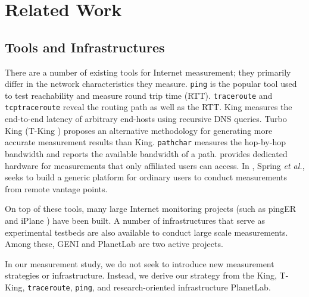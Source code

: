 \section{Related Work}
\label{sec:related-work}


\subsection{Tools and Infrastructures}
\label{sec:tools}

There are a number of existing tools for Internet measurement; they primarily differ in the network characteristics they measure. \texttt{ping} is the popular tool used to test reachability and measure round trip time (RTT). \texttt{traceroute} \cite{jacobson1989traceroute} and \texttt{tcptraceroute} \cite{toren2001tcptraceroute} reveal the routing path as well as the RTT. King \cite{gummadi2002king} measures the end-to-end latency of arbitrary end-hosts using recursive DNS queries. Turbo King (T-King \cite{leonard2008turbo}) proposes an alternative methodology for generating more accurate measurement results than King. \texttt{pathchar} \cite{jacobson1997pathchar} measures the hop-by-hop bandwidth and \cite{jain2002pathload} reports the available bandwidth of a path. \cite{paxson2002experiences} provides dedicated hardware for measurements that only affiliated users can access. In \cite{spring2003scriptroute}, Spring {\it et al.}, seeks to build a generic platform for ordinary users to conduct measurements from remote vantage points.

On top of these tools, many large Internet monitoring projects (such as pingER \cite{matthews2000pinger} and iPlane \cite{madhyastha2006iplane}) have been built. A number of infrastructures that serve as experimental testbeds are also available to conduct large scale measurements. Among these, GENI \cite{elliott2008geni} and PlanetLab \cite{chun2003planetlab} are two active projects.


In our measurement study, we do not seek to introduce new measurement strategies or infrastructure. Instead, we derive our strategy from the King, T-King, \texttt{traceroute}, \texttt{ping}, and research-oriented infrastructure PlanetLab.

